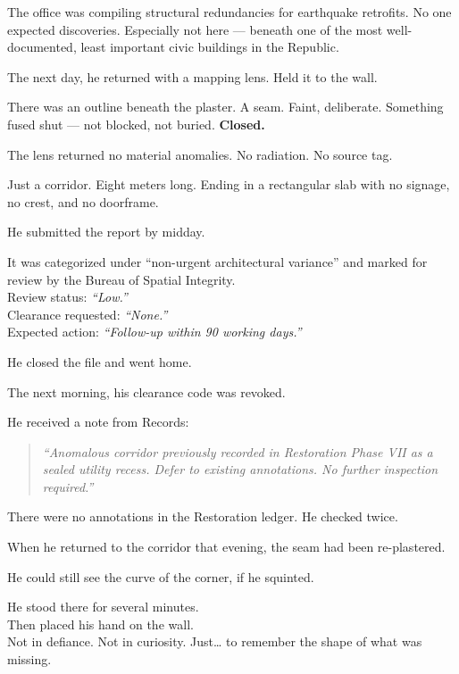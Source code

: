 \documentclass[12pt]{article}
\begin{document}
The office was compiling structural redundancies for earthquake retrofits. No one expected discoveries. Especially not here --- beneath one of the most well-documented, least important civic buildings in the Republic.

The next day, he returned with a mapping lens. Held it to the wall.

There was an outline beneath the plaster. A seam. Faint, deliberate. Something fused shut --- not blocked, not buried. \textbf{Closed.}

The lens returned no material anomalies. No radiation. No source tag.

Just a corridor. Eight meters long. Ending in a rectangular slab with no signage, no crest, and no doorframe.

\vspace{1em}

He submitted the report by midday.

It was categorized under ``non-urgent architectural variance'' and marked for review by the Bureau of Spatial Integrity.\\
Review status: \textit{“Low.”} \\
Clearance requested: \textit{“None.”} \\
Expected action: \textit{“Follow-up within 90 working days.”}

He closed the file and went home.

\vspace{1em}

The next morning, his clearance code was revoked.

He received a note from Records:

\begin{quote}
\textit{“Anomalous corridor previously recorded in Restoration Phase VII as a sealed utility recess. Defer to existing annotations. No further inspection required.”}
\end{quote}

There were no annotations in the Restoration ledger. He checked twice.

When he returned to the corridor that evening, the seam had been re-plastered.

He could still see the curve of the corner, if he squinted.

He stood there for several minutes.\\
Then placed his hand on the wall.\\
Not in defiance. Not in curiosity. Just… to remember the shape of what was missing.
\end{document}
